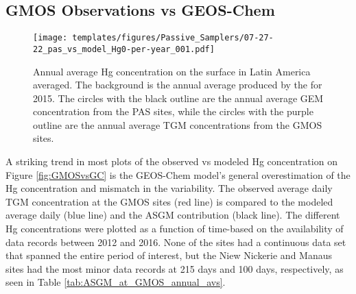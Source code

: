 \subsection{GMOS Observations vs GEOS-Chem}
\begin{figure}[H]
\centering
  \texttt{[image: templates/figures/Passive\_Samplers/07-27-22\_pas\_vs\_model\_Hg0-per-year\_001.pdf]}
  \caption{Annual average Hg concentration on the surface in Latin America averaged. The background is the annual average \hgc produced by the \on for 2015. The circles with the black outline are the annual average GEM concentration from the PAS sites, while the circles with the purple outline are the annual average TGM concentrations from the GMOS sites.}
  \label{fig:06-12-22_pas_vs_model_Hg0-per-year_001}
  
  
\end{figure}
\FloatBarrier
\begin{flushleft}
A striking trend in most plots of the observed vs modeled Hg concentration on Figure \ref{fig:GMOSvsGC} is the GEOS-Chem model's general overestimation of the Hg concentration and mismatch in the variability. The observed average daily TGM concentration at the GMOS sites (red line) is compared to the modeled \on average daily \hg (blue line) and the ASGM contribution (black line). The different Hg concentrations were plotted as a function of time-based on the availability of data records between 2012 and 2016. None of the sites had a continuous data set that spanned the entire period of interest, but the Niew Nickerie and Manaus sites had the most minor data records at 215 days and 100 days, respectively, as seen in Table \ref{tab:ASGM_at_GMOS_annual_avs}.   
\end{flushleft}
\begin{table}[H]
\label{tab:ASGM_at_GMOS_annual_avs}

\centering
{}

\end{table}
